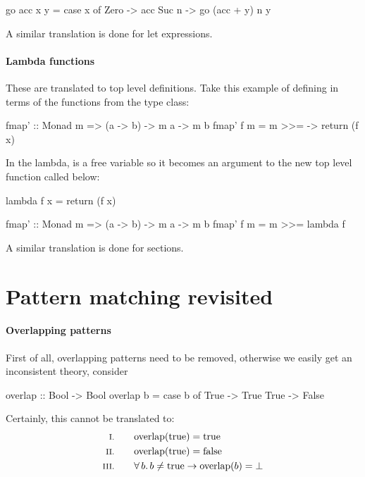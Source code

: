 \begin{code}
go acc x y = case x of
     Zero  -> acc
     Suc n -> go (acc + y) n y
\end{code}

A similar translation is done for let expressions.

\paragraph{Lambda functions} These are translated to top level
definitions. Take this example of defining  in terms of the
functions from the  type class:

\begin{code}
fmap' :: Monad m => (a -> b) -> m a -> m b
fmap' f m = m >>= \x -> return (f x)
\end{code}

\noindent
In the lambda,  is a free variable so it becomes an argument to
the new top level function called  below:

\begin{code}
lambda f x = return (f x)

fmap' :: Monad m => (a -> b) -> m a -> m b
fmap' f m = m >>= lambda f
\end{code}

A similar translation is done for sections.

\section{Pattern matching revisited}

\paragraph{Overlapping patterns} First of all, overlapping patterns need to be removed, otherwise we
easily get an inconsistent theory, consider

\begin{code}
overlap :: Bool -> Bool
overlap b = case b of
              True -> True
              True -> False
\end{code}

Certainly, this cannot be translated to:
\begin{align*}
\rom{1} \qquad & \fn{overlap}(\fn{true}) = \fn{true} \\
\rom{2} \qquad & \fn{overlap}(\fn{true}) = \fn{false} \\
\rom{3} \qquad & \fa{b} b \neq \fn{true} \rightarrow \fn{overlap}(b) = \bot
\end{align*}

